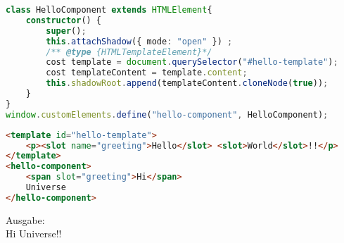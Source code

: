 \cite{MDNSlots}

\begin{lstlisting}[language=TypeScript,caption={Web Component Beispiel (JavaScript)}]
class HelloComponent extends HTMLElement{
    constructor() {
        super();
        this.attachShadow({ mode: "open" }) ;
        /** @type {HTMLTemplateElement}*/
        cost template = document.querySelector("#hello-template");
        cost templateContent = template.content;
        this.shadowRoot.append(templateContent.cloneNode(true));
    }   
}
window.customElements.define("hello-component", HelloComponent);
\end{lstlisting}

\begin{lstlisting}[language=HTML,caption={Web Component Beispiel (HTML)}]
<template id="hello-template">
    <p><slot name="greeting">Hello</slot> <slot>World</slot>!!</p>
</template>
<hello-component>
    <span slot="greeting">Hi</span>
    Universe
</hello-component>
\end{lstlisting}

Ausgabe: \\
Hi Universe!!